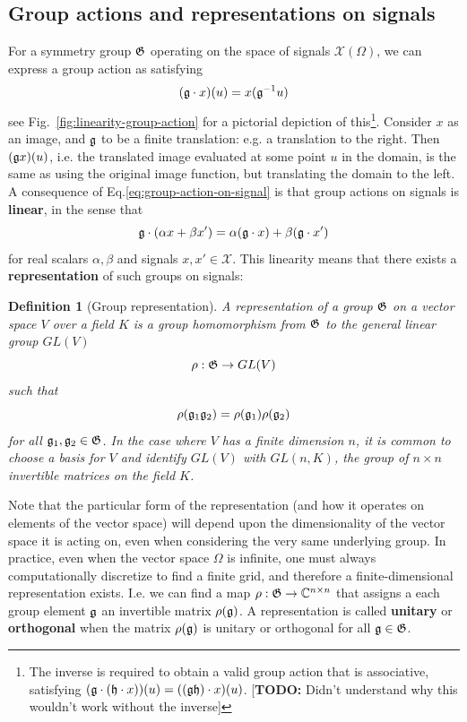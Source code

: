 \documentclass[11pt]{article}
\numberwithin{equation}{section}
\newtheorem{defn}{Definition}[section]
\begin{document}
\subsection{Group actions and representations on signals}
For a symmetry group $\mathfrak{G}$ operating on the space of signals $\mathcal{X}(\Omega)$, we can express a group action as satisfying
\begin{equation}
(\mathfrak{g}\cdot x)(u) = x(\mathfrak{g}^{-1}u) \label{eq:group-action-on-signal}
\end{equation}
see Fig.~\ref{fig:linearity-group-action} for a pictorial depiction of this\footnote{The inverse is required to obtain a valid group action that is associative, satisfying $(\mathfrak{g}\cdot(\mathfrak{h}\cdot x))(u) = ((\mathfrak{gh})\cdot x)(u)$. [\textbf{TODO:} Didn't understand why this wouldn't work without the inverse]}. Consider $x$ as an image, and $\mathfrak{g}$ to be a finite translation: e.g. a translation to the right. Then $(\mathfrak{g}x)(u)$, i.e. the translated image evaluated at some point $u$ in the domain, is the same as using the original image function, but translating the domain to the left. A consequence of Eq.\eqref{eq:group-action-on-signal} is that group actions on signals is \textbf{linear}, in the sense that
\begin{equation}
\mathfrak{g}\cdot(\alpha x + \beta x') = \alpha (\mathfrak{g}\cdot x) + \beta(\mathfrak{g} \cdot x')
\end{equation}
for real scalars $\alpha, \beta$ and signals $x, x' \in \mathcal{X}$. This linearity means that there exists a \textbf{representation} of such groups on signals:
\begin{defn}[Group representation]
A representation of a group $\mathfrak{G}$ on a vector space $V$ over a field $K$ is a group homomorphism from $\mathfrak{G}$ to the general linear group $GL(V)$
\begin{equation}
\rho: \mathfrak{G} \rightarrow GL(V)
\end{equation}
such that 
\begin{equation}
\rho(\mathfrak{g}_1 \mathfrak{g}_2) = \rho(\mathfrak{g}_1) \rho(\mathfrak{g}_2)
\end{equation}
for all $\mathfrak{g}_1, \mathfrak{g}_2 \in \mathfrak{G}$. In the case where $V$ has a finite dimension $n$, it is common to choose a basis for $V$ and identify $GL(V)$ with $GL(n, K)$, the group of $n \times n$ invertible matrices on the field $K$.
\end{defn}
Note that the particular form of the representation (and how it operates on elements of the vector space) will depend upon the dimensionality of the vector space it is acting on, even when considering the very same underlying group. In practice, even when the vector space $\Omega$ is infinite, one must always computationally discretize to find a finite grid, and therefore a finite-dimensional representation exists. I.e. we can find a map $\rho : \mathfrak{G} \rightarrow \mathbb{C}^{n \times n}$ that assigns a each group element $\mathfrak{g}$ an invertible matrix $\rho(\mathfrak{g})$. A representation is called \textbf{unitary} or \textbf{orthogonal} when the matrix $\rho(\mathfrak{g})$ is unitary or orthogonal for all $\mathfrak{g} \in \mathfrak{G}$.
\end{document}
